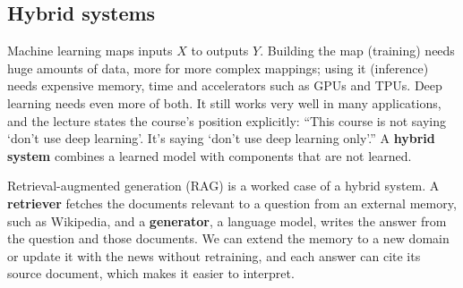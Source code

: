 \subsection{Hybrid systems}\label{sec:intro-hybrid}

Machine learning maps inputs $X$ to outputs $Y$. Building the map (training)
needs huge amounts of data, more for more complex mappings; using it
(inference) needs expensive memory, time and accelerators such as GPUs and
TPUs. Deep learning needs even more of both. It still works very well in many
applications, and the lecture states the course's position explicitly: ``This course is not saying
`don't use deep learning'. It's saying `don't use deep learning only'.'' A
\textbf{hybrid system} combines a learned model with components that are not
learned.

\begin{example}\label{ex:rag}
  Retrieval-augmented generation (RAG) is a worked case of a hybrid system. A
  \textbf{retriever} fetches the documents relevant to a question from an
  external memory, such as Wikipedia, and a \textbf{generator}, a language model,
  writes the answer from the question and those documents. We can extend the
  memory to a new domain or update it with the news without retraining, and
  each answer can cite its source document, which makes it easier to
  interpret.
\end{example}
